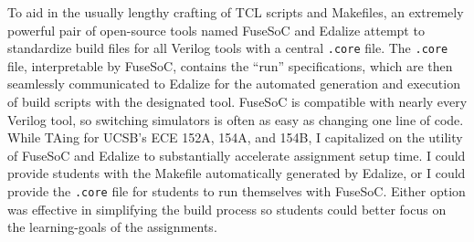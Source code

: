 To aid in the usually lengthy crafting of TCL scripts and Makefiles, an extremely powerful pair of open-source tools named FuseSoC and Edalize \cite{fusesocGitHub, edalizeGitHub} attempt to standardize build files for all Verilog tools with a central \texttt{.core} file. The \texttt{.core} file, interpretable by FuseSoC, contains the \enquote{run} specifications, which are then seamlessly communicated to Edalize for the automated generation and execution of build scripts with the designated tool. FuseSoC is compatible with nearly every Verilog tool, so switching simulators is often as easy as changing one line of code. While TAing for UCSB's ECE 152A, 154A, and 154B, I capitalized on the utility of FuseSoC and Edalize to substantially accelerate assignment setup time. I could provide students with the Makefile automatically generated by Edalize, or I could provide the \texttt{.core} file for students to run themselves with FuseSoC. Either option was effective in simplifying the build process so students could better focus on the learning-goals of the assignments.
